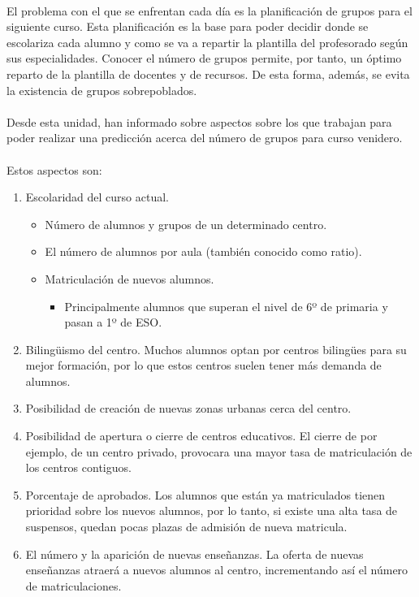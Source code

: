 \documentclass[spanish,12pt, a4paper,twoside]{paper}
\begin{document}
\paragraph{}
El problema con el que se enfrentan cada día es la planificación de grupos para el siguiente curso. Esta planificación es la base para poder decidir donde se escolariza cada alumno y como se va a repartir la plantilla del profesorado según sus especialidades. Conocer el número de grupos permite, por tanto, un óptimo reparto de la plantilla de docentes y de recursos. De esta forma, además, se evita la existencia de grupos sobrepoblados.

\paragraph{}
Desde esta unidad, han informado sobre aspectos sobre los que trabajan para poder realizar una predicción acerca del número de grupos para curso venidero. 

\paragraph{}
Estos aspectos son:

\begin{enumerate}
\item Escolaridad del curso actual.
\begin{itemize}
\item Número de alumnos y grupos de un determinado centro.
\item El número de alumnos por aula (también conocido como ratio).
\item Matriculación de nuevos alumnos.
\begin{itemize}
\item Principalmente alumnos que superan el nivel de 6º de primaria y pasan a 1º de ESO.
\end{itemize}
\end{itemize}

\item Bilingüismo del centro. Muchos alumnos optan por centros bilingües para su mejor formación, por lo que estos centros suelen tener más demanda de alumnos.
\item Posibilidad de creación de nuevas zonas urbanas cerca del centro. 
\item Posibilidad de apertura o cierre de centros educativos. El cierre de por ejemplo, de un centro privado, provocara una mayor tasa de matriculación de los centros contiguos. 
\item Porcentaje de aprobados. Los alumnos que están ya matriculados tienen prioridad sobre los nuevos alumnos, por lo tanto, si existe una alta tasa de suspensos, quedan pocas plazas de admisión de nueva matricula.
\item El número y la aparición de nuevas enseñanzas. La oferta de nuevas enseñanzas atraerá a nuevos alumnos al centro, incrementando así el número de matriculaciones.
\end{enumerate}
\end{document}
